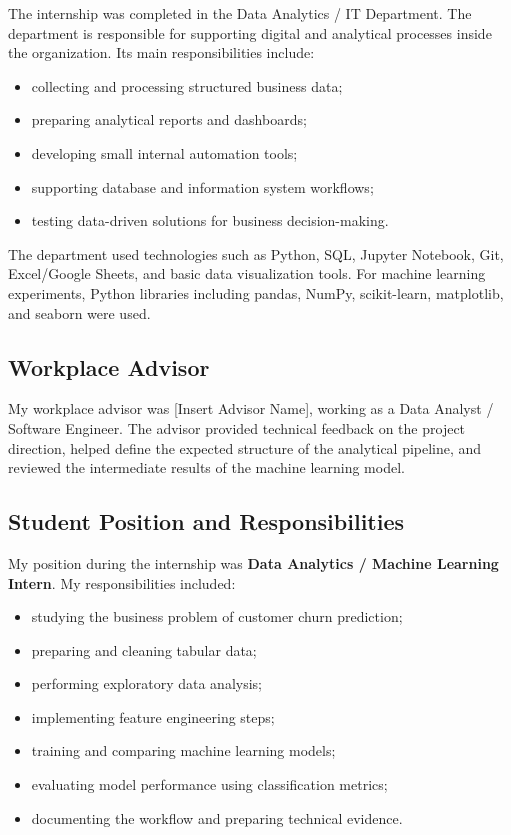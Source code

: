 \documentclass[12pt,a4paper]{article}
\newcommand{\departmentName}{Data Analytics / IT Department}
\newcommand{\advisorName}{[Insert Advisor Name]}
\newcommand{\advisorRole}{Data Analyst / Software Engineer}
\begin{document}
The internship was completed in the \departmentName{}. The department is responsible for supporting digital and analytical processes inside the organization. Its main responsibilities include:

\begin{itemize}
    \item collecting and processing structured business data;
    \item preparing analytical reports and dashboards;
    \item developing small internal automation tools;
    \item supporting database and information system workflows;
    \item testing data-driven solutions for business decision-making.
\end{itemize}

The department used technologies such as Python, SQL, Jupyter Notebook, Git, Excel/Google Sheets, and basic data visualization tools. For machine learning experiments, Python libraries including pandas, NumPy, scikit-learn, matplotlib, and seaborn were used.

\subsection{Workplace Advisor}

My workplace advisor was \advisorName{}, working as a \advisorRole{}. The advisor provided technical feedback on the project direction, helped define the expected structure of the analytical pipeline, and reviewed the intermediate results of the machine learning model.

\subsection{Student Position and Responsibilities}

My position during the internship was \textbf{Data Analytics / Machine Learning Intern}. My responsibilities included:

\begin{itemize}
    \item studying the business problem of customer churn prediction;
    \item preparing and cleaning tabular data;
    \item performing exploratory data analysis;
    \item implementing feature engineering steps;
    \item training and comparing machine learning models;
    \item evaluating model performance using classification metrics;
    \item documenting the workflow and preparing technical evidence.
\end{itemize}
\end{document}
